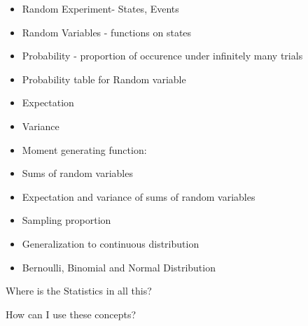 \documentclass{beamer}\usepackage[]{graphicx}\usepackage[]{color}
\begin{document}
\begin{frame}[fragile]

\begin{itemize}
\item Random Experiment- States, Events \pause
\item Random Variables - functions on states \pause
\item Probability - proportion of occurence under infinitely many trials \pause
\item Probability table for Random variable \pause
\item Expectation \pause
\item Variance \pause
\item Moment generating function:  \pause
\item Sums of random variables \pause
\item Expectation and variance of sums of random variables \pause
\item Sampling proportion  \pause
\item Generalization to continuous distribution \pause
\item Bernoulli, Binomial and Normal Distribution 
\end{itemize}

\end{frame}


\begin{frame}[fragile]

\Huge{\centering Where is the Statistics in all this?}

\end{frame}

\begin{frame}[fragile]

\Huge{\centering How can I use these concepts?}

\end{frame}
\end{document}
